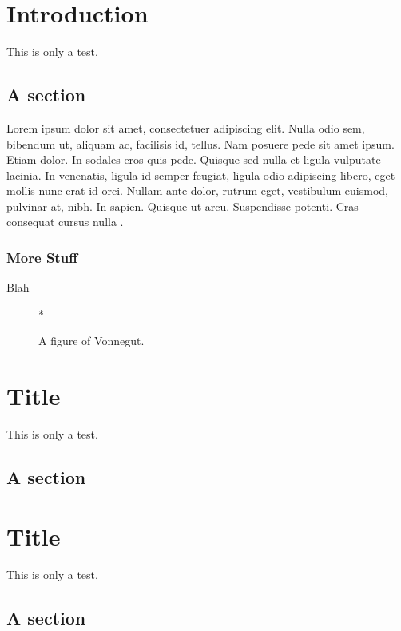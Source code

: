 \documentclass[12pt,chapterheads]{UCMerced}
\begin{document}

%   
%   
\chapter{Introduction}
This is only a test.
\section{A section}
Lorem ipsum dolor sit amet, consectetuer adipiscing elit. Nulla odio
sem, bibendum ut, aliquam ac, facilisis id, tellus. Nam posuere pede
sit amet ipsum. Etiam dolor. In sodales eros quis pede.  Quisque sed
nulla et ligula vulputate lacinia. In venenatis, ligula id semper
feugiat, ligula odio adipiscing libero, eget mollis nunc erat id orci.
Nullam ante dolor, rutrum eget, vestibulum euismod, pulvinar at, nibh.
In sapien. Quisque ut arcu. Suspendisse potenti. Cras consequat cursus
nulla \cite{Goodman}.
\subsection{More Stuff}
Blah

\begin{figure}[h] 
  \begin{center}*\end{center}
    \caption{A figure of Vonnegut.} 
\end{figure}

\chapter{Title}
This is only a test.
\section{A section}

\chapter{Title}
This is only a test.
\section{A section}
\end{document}
